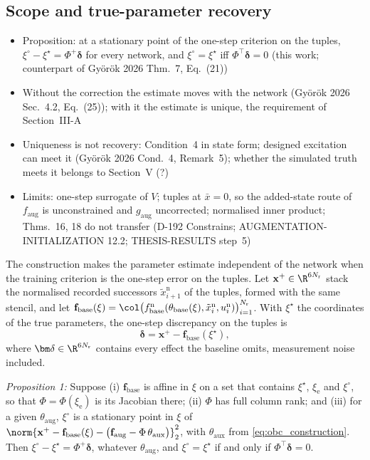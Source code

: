 \subsection{Scope and true-parameter recovery}\label{sec:obc_scope}
\ifdraft
\begin{itemize}
\item Proposition: at a stationary point of the one-step criterion on the tuples, $\xi^\circ-\xi^\star=\Phi^+\bm\delta$ for every network, and $\xi^\circ=\xi^\star$ iff $\Phi^\top\bm\delta=0$ (this work; counterpart of Gy\"or\"ok 2026 Thm.~7, Eq.~(21))
\item Without the correction the estimate moves with the network (Gy\"or\"ok 2026 Sec.~4.2, Eq.~(25)); with it the estimate is unique, the requirement of Section~III-A
\item Uniqueness is not recovery: Condition~4 in state form; designed excitation can meet it (Gy\"or\"ok 2026 Cond.~4, Remark~5); whether the simulated truth meets it belongs to Section~V (?)
\item Limits: one-step surrogate of $V$; tuples at $\bar x=0$, so the added-state route of $f_{\mathrm{aug}}$ is unconstrained and $g_{\mathrm{aug}}$ uncorrected; normalised inner product; Thms.~16, 18 do not transfer (D-192 Constrains; AUGMENTATION-INITIALIZATION 12.2; THESIS-RESULTS step~5)
\end{itemize}
\fi

The construction makes the parameter estimate independent of the network
when the training criterion is the one-step error on the tuples.
Let $\mathbf x^+\in\R^{6N_{\mathrm r}}$ stack the normalised recorded
successors $\tilde x^{\mathrm n}_{i+1}$ of the tuples, formed with the same
stencil, and let
$\mathbf f_{\mathrm{base}}(\xi)=\col\bigl(f^{\mathrm n}_{\mathrm{base}}(\theta_{\mathrm{base}}(\xi),\tilde x^{\mathrm n}_i,u^{\mathrm n}_i)\bigr)_{i=1}^{N_{\mathrm r}}$.
With $\xi^\star$ the coordinates of the true parameters, the one-step
discrepancy on the tuples is
\begin{equation}
 \bm\delta=\mathbf x^+-\mathbf f_{\mathrm{base}}(\xi^\star),
 \label{eq:obc_delta}
\end{equation}
where $\bm\delta\in\R^{6N_{\mathrm r}}$ contains every effect the baseline
omits, measurement noise included.

\textit{Proposition 1:} Suppose (i) $\mathbf f_{\mathrm{base}}$ is affine in
$\xi$ on a set that contains $\xi^\star$, $\xi_{\mathrm e}$ and $\xi^\circ$,
so that $\Phi=\Phi(\xi_{\mathrm e})$ is its Jacobian there; (ii) $\Phi$ has
full column rank; and (iii) for a given $\theta_{\mathrm{aug}}$, $\xi^\circ$ is
a stationary point in $\xi$ of
$\norm{\mathbf x^+-\mathbf f_{\mathrm{base}}(\xi)
-\bigl(\mathbf f_{\mathrm{aug}}-\Phi\,\theta_{\mathrm{aux}}\bigr)}_2^2$,
with $\theta_{\mathrm{aux}}$ from \eqref{eq:obc_construction}.
Then $\xi^\circ-\xi^\star=\Phi^+\bm\delta$, whatever $\theta_{\mathrm{aug}}$,
and $\xi^\circ=\xi^\star$ if and only if $\Phi^\top\bm\delta=0$.

